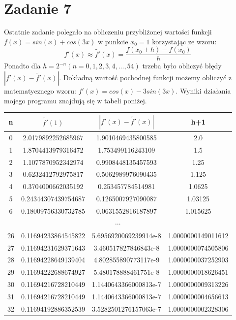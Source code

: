 \documentclass[]{article}
\begin{document}
	\section*{Zadanie 7}
	
	Ostatnie zadanie polegało na obliczeniu przybliżonej wartości funkcji \(f(x) = sin(x) + cos(3x)\) w punkcie $x_0 = 1$ korzystając ze wzoru:
	\[f'(x) \approx \widetilde{f'}(x) = \frac{f(x_0 + h) - f(x_0)}{h}\]
	Ponadto dla \(h = 2^{-n} (n = 0,1,2,3,4,...,54)\) trzeba było obliczyć błędy  \(|f'(x) - \widetilde{f'}(x)|\). Dokładną wartość pochodnej funkcji możemy obliczyć z matematycznego wzoru: \(f'(x) = cos(x) - 3sin(3x)\). Wyniki działania mojego programu znajdują się w tabeli poniżej.
	
	
	\begin{table}[!h]
		\centering
		\label{tab:table1}
		\begin{tabular}{|c|c|c|c|}
			\hline
			n & $\widetilde{f'}(1)$ & \(|f'(x) - \widetilde{f'}(x)|\) & h+1\\ \hline
			0 & 2.0179892252685967 & 1.9010469435800585 & 2.0\\ \hline
			1 & 1.8704413979316472 & 1.753499116243109 & 1.5\\ \hline
			2 & 1.1077870952342974 & 0.9908448135457593 & 1.25\\ \hline
			3 & 0.6232412792975817 & 0.5062989976090435 & 1.125\\ \hline
			4 & 0.3704000662035192 & 0.253457784514981 & 1.0625\\ \hline
			5 & 0.24344307439754687 & 0.1265007927090087 & 1.03125\\ \hline
			6 & 0.18009756330732785 & 0.0631552816187897 & 1.015625\\ \hline
			\multicolumn{4}{c}{$\cdots$} \\ \hline
			26 & 0.11694233864545822 & 5.6956920069239914e-8 & 1.0000000149011612\\ \hline
			27 & 0.11694231629371643 & 3.460517827846843e-8 & 1.0000000074505806\\ \hline
			28 & 0.11694228649139404 & 4.802855890773117e-9 & 1.0000000037252903\\ \hline
			29 & 0.11694222688674927 & 5.480178888461751e-8 & 1.0000000018626451\\ \hline
			30 & 0.11694216728210449 & 1.1440643366000813e-7 & 1.0000000009313226\\ \hline
			31 & 0.11694216728210449 & 1.1440643366000813e-7 & 1.0000000004656613\\ \hline
			32 & 0.11694192886352539 & 3.5282501276157063e-7 & 1.0000000002328306\\ \hline

\end{tabular}
\end{table}
\end{document}
